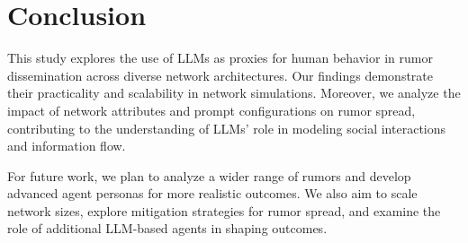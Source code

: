 \section{Conclusion}
\label{sec:conclusions}

This study explores the use of LLMs as proxies for human behavior in rumor dissemination across diverse network architectures. 
Our findings demonstrate their practicality and scalability in network simulations. 
Moreover, we analyze the impact of network attributes and prompt configurations on rumor spread, contributing to the understanding of LLMs' role in modeling social interactions and information flow.

For future work, we plan to analyze a wider range of rumors and develop advanced agent personas for more realistic outcomes. 
We also aim to scale network sizes, explore mitigation strategies for rumor spread, and examine the role of additional LLM-based agents in shaping outcomes.





